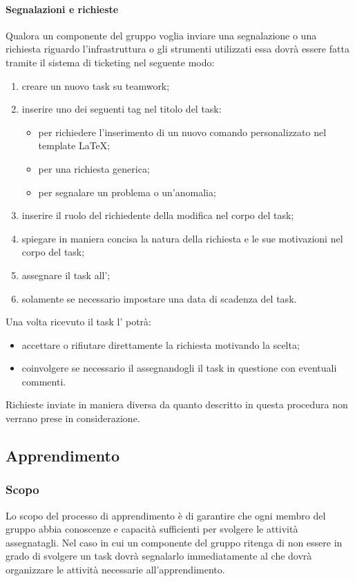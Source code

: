 	\paragraph{Segnalazioni e richieste} \label{sec:procRichieste}
	Qualora un componente del gruppo voglia inviare una segnalazione o una richiesta riguardo l'infrastruttura o gli strumenti utilizzati essa dovrà essere fatta tramite il sistema di ticketing nel seguente modo:
	\begin{enumerate}
		\item creare un nuovo task su teamwork;
		\item inserire uno dei seguenti tag nel titolo del task:
		\begin{itemize}
			\item \cit{[NCR]} per richiedere l'inserimento di un nuovo comando personalizzato nel template \LaTeX;
			\item \cit{[RICHIESTA]} per una richiesta generica;
			\item \cit{[SEGNALAZIONE]} per segnalare un problema o un'anomalia;
		\end{itemize}
		\item inserire il ruolo del richiedente della modifica nel corpo del task;
		\item spiegare in maniera concisa la natura della richiesta e le sue motivazioni nel corpo del task;
		\item assegnare il task all'\amministratore;
		\item solamente se necessario impostare una data di scadenza del task.
	\end{enumerate}
	Una volta ricevuto il task l'\amministratore{} potrà:
	\begin{itemize}
		\item accettare o rifiutare direttamente la richiesta motivando la scelta;
		\item coinvolgere se necessario il \responsabilediprogetto{} assegnandogli il task in questione con eventuali commenti.
	\end{itemize}
	Richieste inviate in maniera diversa da quanto descritto in questa procedura non verrano prese in considerazione.
	\subsection{Apprendimento}
	\subsubsection{Scopo}
	Lo scopo del processo di apprendimento è di garantire che ogni membro del gruppo abbia conoscenze e capacità sufficienti per svolgere le attività assegnatagli. Nel caso in cui un componente del gruppo ritenga di non essere in grado di svolgere un task dovrà segnalarlo immediatamente al \responsabilediprogetto{} che dovrà organizzare le attività necessarie all'apprendimento.
